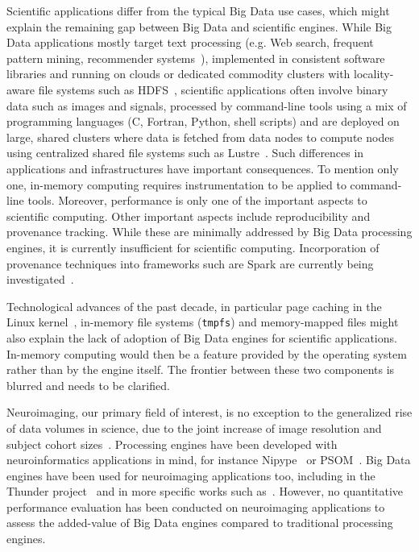 \documentclass{IEEEtran}
\newcommand{\todo}[1]{\marginpar{\parbox{18mm}{\flushleft\tiny\color{red}\textbf{TODO}:
      #1}}}
\begin{document}
Scientific applications differ from the typical Big Data use 
cases, which might explain the remaining gap between Big Data and 
scientific engines. While Big Data applications mostly target text 
processing (e.g. Web search, frequent pattern mining, recommender 
systems~\cite{leskovec2014mining}), implemented in consistent software 
libraries and running on clouds or dedicated commodity clusters with locality-aware 
file systems such as HDFS~\cite{shvachko2010hadoop}, scientific applications 
often involve binary data such as images and signals, processed by 
command-line tools using a mix of programming languages (C, Fortran, 
Python, shell scripts) and are deployed on large, shared clusters where 
data is fetched from data nodes to compute nodes using centralized shared file 
systems such as Lustre~\cite{schwan2003lustre}. Such differences in 
applications and infrastructures have important consequences. To 
mention only one, in-memory computing requires instrumentation to be 
applied to command-line tools. Moreover, performance is only one of the important
aspects to scientific computing. Other important aspects include reproducibility 
and provenance tracking. While these are minimally addressed by Big Data
processing engines, it is currently insufficient for scientific computing. 
Incorporation of provenance techniques into frameworks such are Spark are
currently being investigated~\cite{samba}.

Technological advances of the past decade, in particular page caching 
in the Linux kernel~\cite{love2010linux}, in-memory file systems 
(\texttt{tmpfs}) and memory-mapped files\todo{check that} might also 
explain the lack of adoption of Big Data engines for scientific 
applications.
In-memory computing would then be a feature provided by 
the operating system rather than by the engine itself. The frontier 
between these two components is blurred and needs to be clarified.



Neuroimaging, our primary field of interest, is no exception to the 
generalized rise of data volumes in science, due to the joint increase 
of image resolution and subject cohort sizes~\cite{van2014human}. 
Processing engines have been developed with neuroinformatics 
applications in mind, for instance Nipype~\cite{gorgolewski2011nipype} 
or PSOM~\cite{bellec2012pipeline}. Big Data engines have been used for 
neuroimaging applications too, including in the Thunder 
project~\cite{freeman2014mapping} and in more specific works such 
as~\cite{makkie2019fast}. However, no quantitative performance 
evaluation has been conducted on neuroimaging applications to assess the 
added-value of Big Data engines compared to traditional processing engines.
\end{document}
